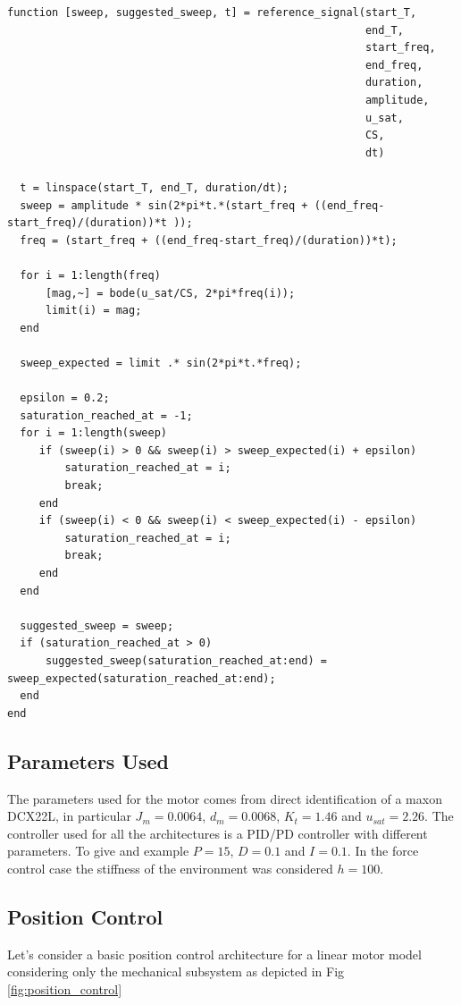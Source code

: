 \documentclass[a4paper,11pt]{article}
\begin{document}
\begin{Verbatim}[fontsize=\small]
function [sweep, suggested_sweep, t] = reference_signal(start_T, 
                                                        end_T, 
                                                        start_freq, 
                                                        end_freq, 
                                                        duration, 
                                                        amplitude, 
                                                        u_sat, 
                                                        CS, 
                                                        dt)

  t = linspace(start_T, end_T, duration/dt);
  sweep = amplitude * sin(2*pi*t.*(start_freq + ((end_freq-start_freq)/(duration))*t ));
  freq = (start_freq + ((end_freq-start_freq)/(duration))*t);

  for i = 1:length(freq) 
      [mag,~] = bode(u_sat/CS, 2*pi*freq(i));
      limit(i) = mag;
  end

  sweep_expected = limit .* sin(2*pi*t.*freq);

  epsilon = 0.2;
  saturation_reached_at = -1;
  for i = 1:length(sweep)
     if (sweep(i) > 0 && sweep(i) > sweep_expected(i) + epsilon)
         saturation_reached_at = i;
         break;
     end
     if (sweep(i) < 0 && sweep(i) < sweep_expected(i) - epsilon)
         saturation_reached_at = i;
         break;
     end
  end
  
  suggested_sweep = sweep;
  if (saturation_reached_at > 0)
      suggested_sweep(saturation_reached_at:end) = sweep_expected(saturation_reached_at:end);
  end
end
\end{Verbatim}

\newpage

\subsection{Parameters Used}

\bigskip
The parameters used for the motor comes from direct identification of a maxon DCX22L, in particular $J_m = 0.0064$, $d_m = 0.0068$, $K_t = 1.46$ and $u_{sat} = 2.26$. The controller used for all the architectures is a PID/PD controller with different parameters. To give and example $P = 15$, $D = 0.1$ and $I = 0.1$. In the force control case the stiffness of the environment was considered $h = 100$.

\bigskip
\subsection{Position Control}
Let's consider a basic position control architecture for a linear motor model considering only the mechanical subsystem as depicted in Fig \ref{fig:position_control}
\end{document}
